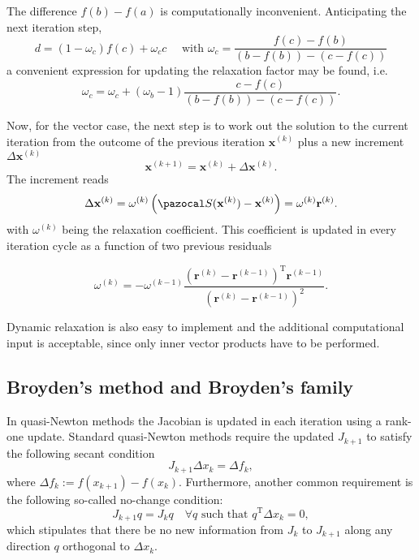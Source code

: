 The difference \(f(b)-f(a)\) is computationally inconvenient. 
Anticipating the next iteration step,
\begin{equation}
d=\left(1-\omega_{c}\right) f(c)+\omega_{c} c \quad \text { with } \omega_{c}=\frac{f(c)-f(b)}{\left(b-f(b)\right)-\left(c-f(c)\right)}
\end{equation}
a convenient expression for updating the relaxation factor may be found, i.e.
\begin{equation}
\omega_{c}=\omega_{c}+\left(\omega_{b}-1\right) \frac{c-f(c)}{\left(b-f(b)\right)-\left(c-f(c)\right)}.
\end{equation}

Now, for the vector case, the next step is to work out the solution to the current iteration from the outcome of the previous iteration $\mathbf{x}^{(k)}$ plus a new increment $\Delta \mathbf{x}^{(k)}$
\begin{equation}
\mathbf{x}^{(k+1)}=\mathbf{x}^{(k)}+\Delta \mathbf{x}^{(k)}.
\end{equation}
The increment reads
\begin{equation}
\Delta \mathbf{x}^{(k)}=\omega^{(k)}\left(\pazocal S(\mathbf{x}^{(k)})-\mathbf{x}^{(k)}\right)=\omega^{(k)} \mathbf r^{(k)}.
\end{equation}
with $\omega^{(k)}$ being the relaxation coefficient.
This coefficient is updated in every iteration cycle as a function of two previous residuals
\begin{highlight}
  \begin{equation}
    \omega^{(k)}=-\omega^{(k-1)} \frac{\left(\mathbf{r}^{(k)}-\mathbf{r}^{(k-1)}\right)^{\mathrm{T}} \mathbf{r}^{(k-1)}}{\left(\mathbf{r}^{(k)}-\mathbf{r}^{(k-1)}\right)^{2}}.
  \end{equation}
\end{highlight}

Dynamic relaxation is also easy to implement and the additional computational input is acceptable, since only inner vector products have to be performed. 

\subsection{Broyden's method and Broyden's family}

In quasi-Newton methods the Jacobian is updated in each iteration using a rank-one update.
Standard quasi-Newton methods require the updated \(J_{k+1}\) to satisfy the following secant condition
\begin{equation} \label{eq:secant_condition}
J_{k+1} \Delta x_{k}=\Delta f_{k},
\end{equation}
where \(\Delta f_{k}:=f\left(x_{k+1}\right)-f\left(x_{k}\right)\).
Furthermore, another common requirement is the following so-called no-change condition:
\begin{equation} \label{eq:no_change_condition}
J_{k+1} q=J_{k} q \quad \forall q \text { such that } q^{\mathrm{T}} \Delta x_{k}=0,
\end{equation}
which stipulates that there be no new information from \(J_{k}\) to \(J_{k+1}\) along any direction \(q\) orthogonal to \(\Delta x_{k}\).

